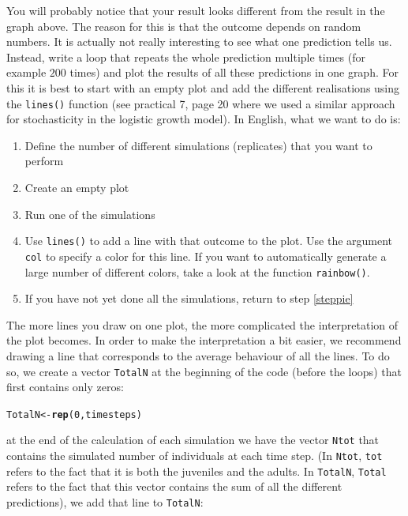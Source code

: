 \documentclass{article}\usepackage[]{graphicx}\usepackage[]{color}
\makeatletter
\newcommand{\hlnum}[1]{\textcolor[rgb]{0.686,0.059,0.569}{#1}}%
\newcommand{\hlstd}[1]{\textcolor[rgb]{0.345,0.345,0.345}{#1}}%
\newcommand{\hlkwb}[1]{\textcolor[rgb]{0.69,0.353,0.396}{#1}}%
\newcommand{\hlkwd}[1]{\textcolor[rgb]{0.737,0.353,0.396}{\textbf{#1}}}%
\newenvironment{kframe}{%
 \def\at@end@of@kframe{}%
 \ifinner\ifhmode%
  \def\at@end@of@kframe{\end{minipage}}%
  \begin{minipage}{\columnwidth}%
 \fi\fi%
 \def\FrameCommand##1{\hskip\@totalleftmargin \hskip-\fboxsep
 \colorbox{shadecolor}{##1}\hskip-\fboxsep
     \hskip-\linewidth \hskip-\@totalleftmargin \hskip\columnwidth}%
 \MakeFramed {\advance\hsize-\width
   \@totalleftmargin\z@ \linewidth\hsize
   \@setminipage}}%
 {\par\unskip\endMakeFramed%
 \at@end@of@kframe}
\newenvironment{knitrout}{}{} %
\makeatother
\begin{document}
You will probably notice that your result looks different from the result in the graph above. The reason for this is that the outcome depends on random numbers. It is actually not really interesting to see what one prediction tells us. Instead, write a loop that repeats the whole prediction multiple times (for example $200$ times) and plot the results of all these predictions in one graph. For this it is best to start with an empty plot and add the different realisations using the \texttt{lines()} function (see practical 7, page 20 where we used a similar approach for stochasticity in the logistic growth model). In English, what we want to do is:

\begin{enumerate}
\item Define the number of different simulations (replicates) that you want to perform
\item Create an empty plot
\item Run one of the simulations\label{steppie}
\item Use \texttt{lines()} to add a line with that outcome to the plot. Use the argument \texttt{col} to specify a color for this line. If you want to automatically generate a large number of different colors, take a look at the function \texttt{rainbow()}.
\item If you have not yet done all the simulations, return to step \ref{steppie}
\end{enumerate}
The more lines you draw on one plot, the more complicated the interpretation of the plot becomes. In order to make the interpretation a bit easier, we recommend drawing a line that corresponds to the average behaviour of all the lines. To do so, we create a vector \texttt{TotalN} at the beginning of the code (before the loops) that first contains only zeros:
\begin{knitrout}
\color{fgcolor}\begin{kframe}
\begin{alltt}
\hlstd{TotalN}\hlkwb{<-}\hlkwd{rep}\hlstd{(}\hlnum{0}\hlstd{,timesteps)}
\end{alltt}
\end{kframe}
\end{knitrout}
at the end of the calculation of each simulation we have the vector \texttt{Ntot} that contains the simulated number of individuals at each time step. (In \texttt{Ntot}, \texttt{tot} refers to the fact that it is both the juveniles and the adults. In \texttt{TotalN}, \texttt{Total} refers to the fact that this vector contains the sum of all the different predictions), we add that line to \texttt{TotalN}:
\end{document}
